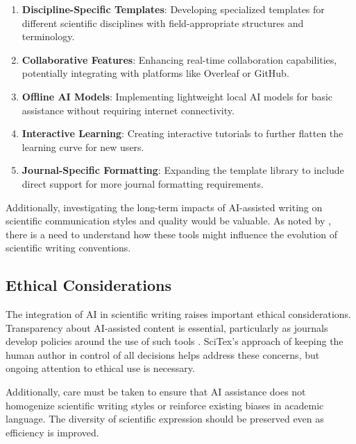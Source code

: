 \begin{enumerate}
    \item \textbf{Discipline-Specific Templates}: Developing specialized templates for different scientific disciplines with field-appropriate structures and terminology.
    \item \textbf{Collaborative Features}: Enhancing real-time collaboration capabilities, potentially integrating with platforms like Overleaf or GitHub.
    \item \textbf{Offline AI Models}: Implementing lightweight local AI models for basic assistance without requiring internet connectivity.
    \item \textbf{Interactive Learning}: Creating interactive tutorials to further flatten the learning curve for new users.
    \item \textbf{Journal-Specific Formatting}: Expanding the template library to include direct support for more journal formatting requirements.
\end{enumerate}

Additionally, investigating the long-term impacts of AI-assisted writing on scientific communication styles and quality would be valuable. As noted by \cite{patel2024evolution}, there is a need to understand how these tools might influence the evolution of scientific writing conventions.

\subsection{Ethical Considerations}

The integration of AI in scientific writing raises important ethical considerations. Transparency about AI-assisted content is essential, particularly as journals develop policies around the use of such tools \cite{nature2023editorial}. SciTex's approach of keeping the human author in control of all decisions helps address these concerns, but ongoing attention to ethical use is necessary.

Additionally, care must be taken to ensure that AI assistance does not homogenize scientific writing styles or reinforce existing biases in academic language. The diversity of scientific expression should be preserved even as efficiency is improved.